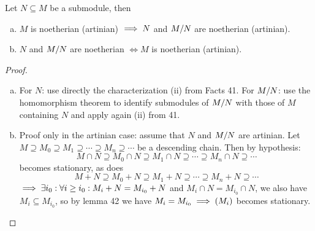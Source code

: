 \documentclass[a4paper]{report}
\begin{document}
\begin{thm}
  Let $N \subseteq M$ be a submodule, then
  \begin{enumerate}[(a)]
    \item $M$ is noetherian (artinian) $\implies N$ and $\fak MN$ are noetherian (artinian).
          \item $N$ and $\fak MN$ are noetherian $\iff M$ is noetherian (artinian).
  \end{enumerate}
\end{thm}
\begin{proof}
\begin{enumerate}[(a)]
  \item For $N$: use directly the characterization (ii) from Facts 41. For $\fak MN$: use the homomorphism theorem to identify submodules of $\fak MN$ with those of $M$ containing $N$ and apply again (ii) from 41.
  \item Proof only in the artinian case: assume that $N$ and $\fak MN$ are artinian. Let $M \supseteq M_0 \supseteq M_{1} \supseteq \cdots \supseteq M_{n} \supseteq \cdots$ be a descending chain. Then by hypothesis: \[M \cap N\supseteq M_0 \cap N\supseteq M_{1} \cap N\supseteq \cdots \supseteq M_{n} \cap N \supseteq \cdots\]
        becomes stationary, as does \[M + N\supseteq M_0 + N\supseteq M_{1} + N\supseteq \cdots \supseteq M_{n} + N \supseteq \cdots\]
        $\implies \exists i_{0} : \forall i \ge i_{0}: M_{i} + N = M_{i_{0}} + N$ and $M_{i} \cap N = M_{i_{0}} \cap N$, we also have $M_{i} \subseteq M_{i_{0}}$, so by lemma 42 we have $M_{i} = M_{i_{0}} \implies (M_{i})$ becomes stationary. \qedhere
\end{enumerate}
\end{proof}
\end{document}
